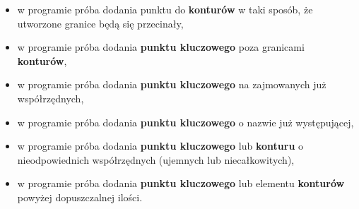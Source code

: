 \documentclass[a4paper, 10pt, titlepage]{article}
\begin{document}
\begin{itemize}
\item w programie próba dodania punktu do \textbf{konturów} w taki sposób, że utworzone granice będą się przecinały,
\item w programie próba dodania \textbf{punktu kluczowego} poza granicami \textbf{konturów},
\item w programie próba dodania \textbf{punktu kluczowego} na zajmowanych już współrzędnych, 
\item w programie próba dodania \textbf{punktu kluczowego} o nazwie już występującej,
\item w programie próba dodania \textbf{punktu kluczowego} lub \textbf{konturu} o nieodpowiednich współrzędnych (ujemnych lub niecałkowitych),
\item w programie próba dodania \textbf{punktu kluczowego} lub elementu \textbf{konturów} powyżej dopuszczalnej ilości.
\end{itemize}
\end{document}
